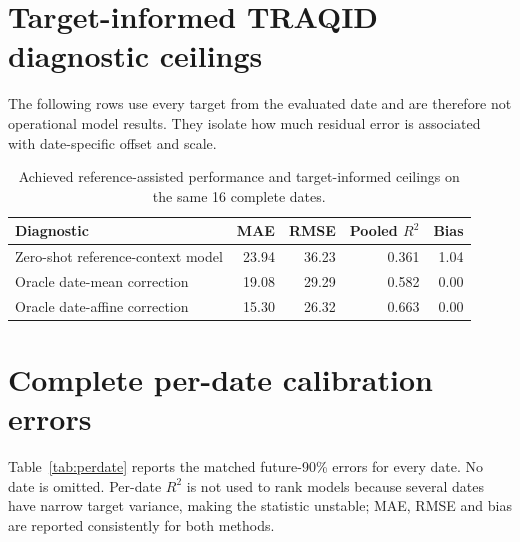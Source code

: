 \documentclass[review,12pt,authoryear]{elsarticle}
\newcommand{\Rtwo}{\ensuremath{R^2}}
\begin{document}
\section{Target-informed TRAQID diagnostic ceilings}
\label{app:oracle}

The following rows use every target from the evaluated date and are therefore
not operational model results. They isolate how much residual error is associated
with date-specific offset and scale.

\begin{table}[H]
\centering
\caption{Achieved reference-assisted performance and target-informed ceilings
on the same 16 complete dates.}
\begin{tabular}{lrrrr}
\toprule
Diagnostic & MAE & RMSE & Pooled \Rtwo & Bias \\
\midrule
Zero-shot reference-context model & 23.94 & 36.23 & 0.361 & 1.04 \\
Oracle date-mean correction & 19.08 & 29.29 & 0.582 & 0.00 \\
Oracle date-affine correction & 15.30 & 26.32 & 0.663 & 0.00 \\
\bottomrule
\end{tabular}
\end{table}

\section{Complete per-date calibration errors}

Table~\ref{tab:perdate} reports the matched future-90\% errors for every date.
No date is omitted. Per-date \Rtwo{} is not used to rank models because several
dates have narrow target variance, making the statistic unstable; MAE, RMSE and
bias are reported consistently for both methods.
\end{document}
